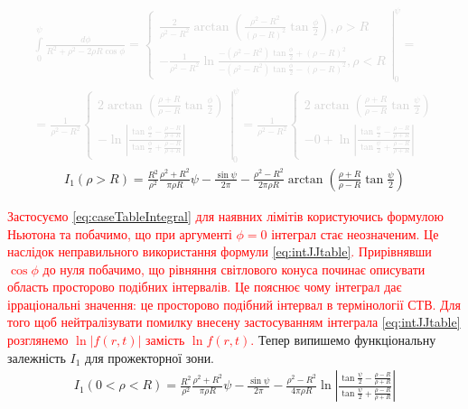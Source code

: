 \textcolor{lightgray}{ \begin{equation*} \begin{aligned}
\int \limits_{0}^{\psi} \frac{d \phi}{R^2 + \rho^2 - 2 \rho R \cos \phi} =
\left. \begin{cases}
\frac{2}{\rho^2 - R^2} \arctan \left( \frac{\rho^2 - R^2}
{\left( \rho - R \right)^2} \tan \frac{\phi}{2} \right), \rho > R \\
- \frac{1}{\rho^2 - R^2} \ln
\frac{- \left( \rho^2 - R^2 \right) \tan \frac{\phi}{2} + \left( \rho - R \right)^2}
{- \left( \rho^2 - R^2 \right) \tan \frac{\phi}{2} - \left( \rho - R \right)^2}
, \rho < R
\end{cases} \right|_{0}^{\psi} = \\
= \frac{1}{\rho^2 - R^2} \left. \begin{cases} 
2 \arctan \left( \frac{\rho + R}{\rho - R} \tan \frac{\phi}{2} \right) \\
- \ln \left| \frac{\tan \frac{\phi}{2} - \frac{\rho - R}{\rho + R}} 
{\tan \frac{\phi}{2} + \frac{\rho - R}{\rho + R}} \right|
\end{cases} \right|_{0}^{\psi} = 
\frac{1}{\rho^2 - R^2} \begin{cases} 
2 \arctan \left( \frac{\rho + R}{\rho - R} \tan \frac{\psi}{2} \right) \\
- 0 + \ln \left| \frac{\tan \frac{\psi}{2} - \frac{\rho - R}{\rho + R}}
{\tan \frac{\psi}{2} + \frac{\rho - R}{\rho + R}} \right|
\end{cases}
\end{aligned} \end{equation*} }
%
\begin{equation*} \begin{aligned}
I_1 \left( \rho > R \right) = 
\frac{R^2}{\rho^2} \frac{\rho^2 + R^2}{\pi \rho R} \psi - 
\frac{\sin \psi}{2 \pi} - \frac{\rho^2 - R^2}{2 \pi \rho R} 
\arctan \left( \frac{\rho + R}{\rho - R} \tan \frac{\psi}{2} \right)
\end{aligned} \end{equation*}

\textcolor{red}{ Застосуємо \eqref{eq:caseTableIntegral} для наявних лімітів 
користуючись формулою Ньютона та побачимо, що при аргументі $ \phi = 0 $ інтеграл 
стає неозначеним. Це наслідок неправильного використання формули 
\eqref{eq:intJJtable}. Прирівнявши $ \cos \phi $ до нуля побачимо, що рівняння 
світлового конуса починає описувати область просторово подібних інтервалів. Це 
пояснює чому інтеграл дає ірраціональні значення: це просторово подібний інтервал в 
термінології СТВ. Для того щоб нейтралізувати помилку внесену застосуванням 
інтеграла \eqref{eq:intJJtable} розглянемо $ \ln |f(r,t)| $ замість 
$ \ln f(r,t) $.} Тепер випишемо функціональну залежність $ I_1 $ для прожекторної 
зони.
%
\begin{equation*} \begin{aligned}
I_1 \left( 0 < \rho < R \right) = 
\frac{R^2}{\rho^2} \frac{\rho^2 + R^2}{\pi \rho R} \psi - 
\frac{\sin \psi}{2 \pi} - \frac{\rho^2 - R^2}{4 \pi \rho R} 
\ln \left| \frac{\tan \frac{\psi}{2} - \frac{\rho - R}{\rho + R}}
{\tan \frac{\psi}{2} + \frac{\rho - R}{\rho + R}} \right|
\end{aligned} \end{equation*}

